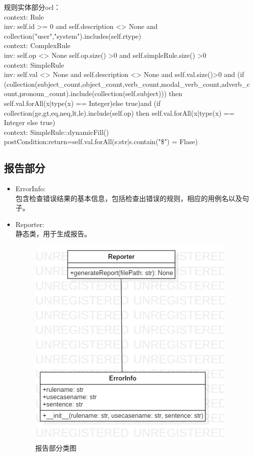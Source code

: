     规则实体部分ocl：\\
    context: Rule\\
    inv: self.id >= 0 and self.description <> None and collection("user","system").includes(self.rtype)\\    
    context: ComplexRule\\
    inv: self.op <> None self.op.size() >0 and self.simpleRule.size() >0\\
    context: SimpleRule\\
    inv: self.val <> None and self.description <> None and self.val.size()>0 and 
    (if (collection(subject\_count,object\_count,verb\_count,modal\_verb\_count,adverb\_count,pronoun\_count).include(collection(self.subject))) then self.val.forAll(x|type(x) == Integer)else true)and
    (if collection(ge,gt,eq,neq,lt,le).include(self.op) then self.val.forAll(x|type(x) == Integer else true)\\
    context: SimpleRule::dynamicFill()\\
    postCondition:return=self.val.forAll(s:str|s.contain("\$") = Flase)
	
    \subsection{报告部分}
    \begin{itemize}
    	\item 	ErrorInfo:\\
    	包含检查错误结果的基本信息，包括检查出错误的规则，相应的用例名以及句子。
    	\item	Reporter:\\
    	静态类，用于生成报告。
    	\begin{figure}
    		\centering
    		\includegraphics[width=.5\textwidth]{src/classDiagram_report.jpg} 
    		\caption{报告部分类图} 
    	\end{figure}
    \end{itemize}
	
